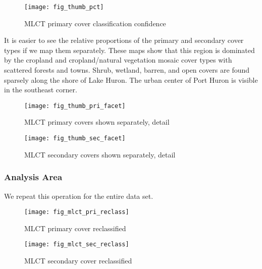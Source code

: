 \begin{figure} 
\begin{center}
  

\texttt{[image: fig\_thumb\_pct]}
\end{center} 
\caption{MLCT primary cover classification confidence} 
\label{fig:thumb_pct} 
\end{figure} 

It is easier to see the relative proportions of the primary and
secondary cover types if we map them separately.  These maps show that
this region is dominated by the cropland and cropland/natural
vegetation mosaic cover types with scattered forests and towns.
Shrub, wetland, barren, and open covers are found sparsely along the
shore of Lake Huron.  The urban center of Port Huron is visible in the
southeast corner.

\begin{figure} 
\begin{center}
  

\texttt{[image: fig\_thumb\_pri\_facet]}
\end{center} 
\caption{MLCT primary covers shown separately, detail} 
\label{fig:thumb_pri_reclass} 
\end{figure} 


\begin{figure} 
\begin{center}
  

\texttt{[image: fig\_thumb\_sec\_facet]}
\end{center} 
\caption{MLCT secondary covers shown separately, detail} 
\label{fig:thumb_pri_reclass} 
\end{figure} 

\subsubsection{Analysis Area}
\label{sec:reclass-analysis-area}

We repeat this operation for the entire data set.


\begin{figure} 
\begin{center}


\texttt{[image: fig\_mlct\_pri\_reclass]}
\end{center} 
\caption{MLCT primary cover reclassified} 
\label{fig:mlct_pri_reclass} 
\end{figure} 


\begin{figure} 
\begin{center}
  

\texttt{[image: fig\_mlct\_sec\_reclass]}
\end{center} 
\caption{MLCT secondary cover reclassified} 
\label{fig:mlct_sec_reclass} 
\end{figure} 


